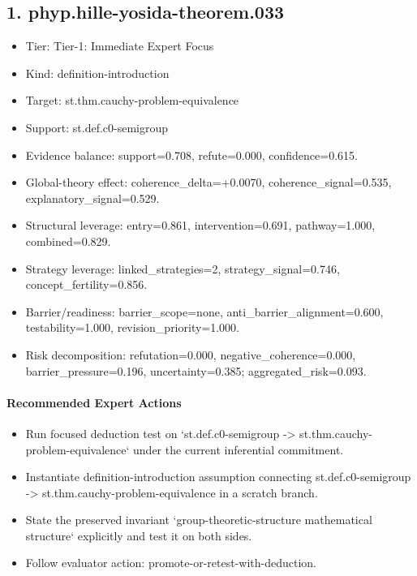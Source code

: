 \documentclass[11pt]{article}
\begin{document}
\subsection*{1. phyp.hille-yosida-theorem.033}
\begin{itemize}
\item Tier: Tier-1: Immediate Expert Focus
\item Kind: definition-introduction
\item Target: st.thm.cauchy-problem-equivalence
\item Support: st.def.c0-semigroup
\item Evidence balance: support=0.708, refute=0.000, confidence=0.615.
\item Global-theory effect: coherence\_delta=+0.0070, coherence\_signal=0.535, explanatory\_signal=0.529.
\item Structural leverage: entry=0.861, intervention=0.691, pathway=1.000, combined=0.829.
\item Strategy leverage: linked\_strategies=2, strategy\_signal=0.746, concept\_fertility=0.856.
\item Barrier/readiness: barrier\_scope=none, anti\_barrier\_alignment=0.600, testability=1.000, revision\_priority=1.000.
\item Risk decomposition: refutation=0.000, negative\_coherence=0.000, barrier\_pressure=0.196, uncertainty=0.385; aggregated\_risk=0.093.
\end{itemize}
\paragraph{Recommended Expert Actions}
\begin{itemize}
\item Run focused deduction test on `st.def.c0-semigroup -> st.thm.cauchy-problem-equivalence` under the current inferential commitment.
\item Instantiate definition-introduction assumption connecting st.def.c0-semigroup -> st.thm.cauchy-problem-equivalence in a scratch branch.
\item State the preserved invariant `group-theoretic-structure mathematical structure` explicitly and test it on both sides.
\item Follow evaluator action: promote-or-retest-with-deduction.
\end{itemize}
\end{document}
